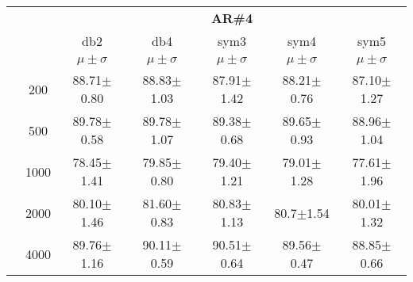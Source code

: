 \begin{table}[H]
\begin{tabular}{|c|c|c c c c c|}
\cline{3-7}
\multicolumn{2}{c|}{\multirow{3}{*}{}} & \multicolumn{5}{c|}{\textbf{AR\#4}}   \\\cline{3-7} 
\multicolumn{2}{c|}{}  & db2 & db4 & sym3 & sym4 & sym5 \\\cline{3-7}%
\multicolumn{2}{c|}{}& $\mu \pm \sigma$ & $\mu \pm \sigma$ & $\mu \pm \sigma$ & $\mu \pm \sigma$ & $\mu \pm \sigma$ \\\hline
& 200	&88.71$\pm$0.80		&88.83$\pm$1.03		&87.91$\pm$1.42	&88.21$\pm$0.76		&87.10$\pm$1.27 \\\cline{2-7}

& 500	& 89.78$\pm$0.58	&89.78$\pm$1.07		&89.38$\pm$0.68	& 89.65$\pm$0.93	& 88.96$\pm$1.04 \\\cline{2-7}

& 1000	&78.45$\pm$1.41		&79.85$\pm$0.80		&79.40$\pm$1.21	&79.01$\pm$1.28		&77.61$\pm$1.96 \\\cline{2-7}

& 2000	&80.10$\pm$1.46		&81.60$\pm$0.83		&80.83$\pm$1.13	&80.7$\pm$1.54		&80.01$\pm$1.32 \\\cline{2-7}

& 4000	 &89.76$\pm$1.16	& 90.11$\pm$0.59	& 90.51$\pm$0.64 &89.56$\pm$0.47	&88.85$\pm$0.66 \\\midrule


	\end{tabular}
\end{table}


